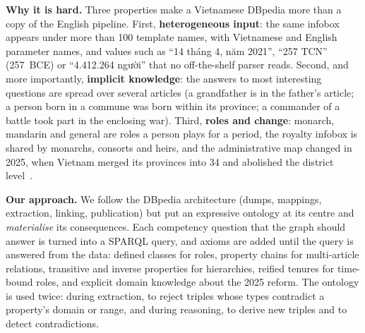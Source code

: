 \documentclass{article}
\begin{document}
\textbf{Why it is hard.} Three properties make a Vietnamese DBpedia more than a copy of the English pipeline. First,
\textbf{heterogeneous input}: the same infobox appears under more than 100 template names, with Vietnamese and English
parameter names, and values such as ``14 tháng 4, năm 2021'', ``257 TCN'' (257~BCE) or ``4.412.264 người'' that no
off-the-shelf parser reads. Second, and more importantly, \textbf{implicit knowledge}: the answers to most interesting
questions are spread over several articles (a grandfather is in the father's article; a person born in a commune was
born within its province; a commander of a battle took part in the enclosing war). Third, \textbf{roles and change}:
monarch, mandarin and general are roles a person plays for a period, the royalty infobox is shared by monarchs,
consorts and heirs, and the administrative map changed in 2025, when Vietnam merged its provinces into 34 and
abolished the district level~\cite{resolution2025}.

\textbf{Our approach.} We follow the DBpedia architecture (dumps, mappings, extraction, linking, publication) but
put an expressive ontology at its centre and \emph{materialise} its consequences. Each competency question that the
graph should answer is turned into a SPARQL query, and axioms are added until the query is answered from the data:
defined classes for roles, property chains for multi-article relations, transitive and inverse properties for
hierarchies, reified tenures for time-bound roles, and explicit domain knowledge about the 2025 reform. The ontology
is used twice: during extraction, to reject triples whose types contradict a property's domain or range, and during
reasoning, to derive new triples and to detect contradictions.
\end{document}
